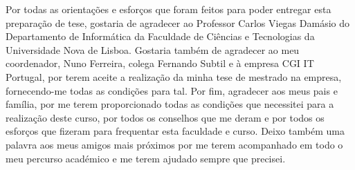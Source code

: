 


\begin{ntacknowledgements}

Por todas as orientações e esforços que foram feitos para poder entregar esta preparação de tese, gostaria de agradecer ao Professor Carlos Viegas Damásio do Departamento de Informática da Faculdade de Ciências e Tecnologias da Universidade Nova de Lisboa. Gostaria também de agradecer ao meu coordenador, Nuno Ferreira, colega Fernando Subtil e à empresa CGI IT Portugal, por terem aceite a realização da minha tese de mestrado na empresa, fornecendo-me todas as condições para tal. Por fim, agradecer aos meus pais e família, por me terem proporcionado todas as condições que necessitei para a realização deste curso, por todos os conselhos que me deram e por todos os esforços que fizeram para frequentar esta faculdade e curso. Deixo também uma palavra aos meus amigos mais próximos por me terem acompanhado em todo o meu percurso académico e me terem ajudado sempre que precisei.

\end{ntacknowledgements}